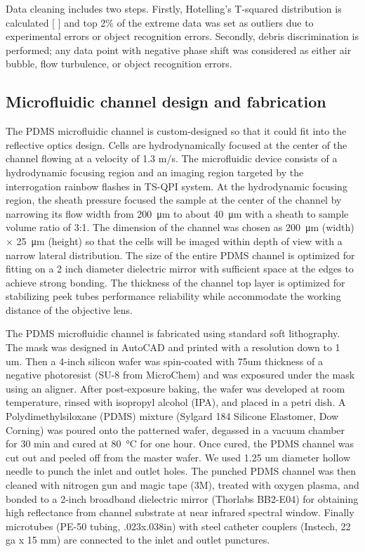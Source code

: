 \documentclass[aps,pra,reprint,superscriptaddress]{revtex4-1}
\begin{document}
Data cleaning includes two steps. Firstly, Hotelling's T-squared distribution is calculated [ ] and top 2\% of the extreme data was set as outliers due to experimental errors or object recognition errors. Secondly, debris discrimination is performed; any data point with negative phase shift was considered as either air bubble, flow turbulence, or object recognition errors.

\subsection{Microfluidic channel design and fabrication}

The PDMS microfluidic channel is custom-designed so that it could fit into the reflective optics design. Cells are hydrodynamically focused \cite{knight1998hydrodynamic,lee2006hydrodynamic} at the center of the channel flowing at a velocity of 1.3 m/s. The microfluidic device consists of a hydrodynamic focusing region and an imaging region targeted by the interrogation rainbow flashes in TS-QPI system. At the hydrodynamic focusing region, the sheath pressure focused the sample at the center of the channel by narrowing its flow width from \SI{200}{\micro\meter} to about \SI{40}{\micro\meter} with a sheath to sample volume ratio of 3:1. The dimension of the channel was chosen as \SI{200}{\micro\meter} (width) $\times$ \SI{25}{\micro\meter} (height) so that the cells will be imaged within depth of view with a narrow lateral distribution. The size of the entire PDMS channel is optimized for fitting on a 2 inch diameter dielectric mirror with sufficient space at the edges to achieve strong bonding. The thickness of the channel top layer is optimized for stabilizing peek tubes performance reliability while accommodate the working distance of the objective lens. 

The PDMS microfluidic channel is fabricated using standard soft lithography. The mask was designed in AutoCAD and printed with a resolution down to 1 um. Then a 4-inch silicon wafer was spin-coated with 75um thickness of a negative photoresist (SU-8 from MicroChem) and was exposured under the mask using an aligner. After post-exposure baking, the wafer was developed at room temperature, rinsed with isopropyl alcohol (IPA), and placed in a petri dish.  A Polydimethylsiloxane (PDMS) mixture (Sylgard 184 Silicone Elastomer, Dow Corning) was poured onto the patterned wafer, degassed in a vacuum chamber for 30 min and cured at \SI{80}{\degreeCelsius} for one hour. Once cured, the PDMS channel was cut out and peeled off from the master wafer. We used 1.25 um diameter hollow needle to punch the inlet and outlet holes. 
The punched PDMS channel was then cleaned with nitrogen gun and magic tape (3M), treated with oxygen plasma, and bonded to a 2-inch broadband dielectric mirror (Thorlabs BB2-E04) for obtaining high reflectance from channel substrate at near infrared spectral window. Finally microtubes (PE-50 tubing, .023x.038in) with steel catheter couplers (Instech, 22 ga x 15 mm) are connected to the inlet and outlet punctures.
\end{document}
